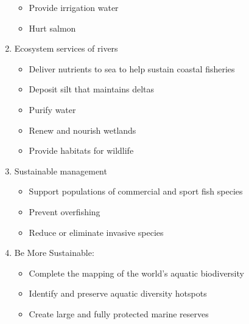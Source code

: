 \documentclass[12pt]{article}
\begin{document}
\begin{enumerate}
\begin{itemize}
      \item Provide irrigation water

      \item Hurt salmon

    \end{itemize}

  \item Ecosystem services of rivers

    \begin{itemize}

      \item Deliver nutrients to sea to help sustain coastal fisheries

      \item Deposit silt that maintains deltas

      \item Purify water

      \item Renew and nourish wetlands

      \item Provide habitats for wildlife

    \end{itemize}

  \item Sustainable management

    \begin{itemize}

      \item Support populations of commercial and sport fish species

      \item Prevent overfishing

      \item Reduce or eliminate invasive species

    \end{itemize}

  \item Be More Sustainable:

    \begin{itemize}

      \item Complete the mapping of the world's aquatic biodiversity

      \item Identify and preserve aquatic diversity hotspots

      \item Create large and fully protected marine reserves


\end{itemize}
\end{enumerate}
\end{document}

